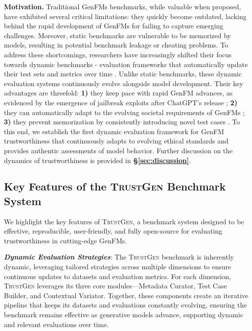 \textbf{Motivation.} Traditional GenFMs benchmarks, while valuable when proposed, have exhibited several critical limitations: they quickly become outdated, lacking behind the rapid development of GenFMs for failing to capture emerging challenges. Moreover, static benchmarks are vulnerable to be memorized by models, resulting in potential benchmark leakage or cheating problems. To address these shortcomings, researchers have increasingly shifted their focus towards dynamic benchmarks - evaluation frameworks that automatically update their test sets and metrics over time \citep{zhang2024task,li2024autobencher,Ni2024MixEvalDW,Li2023LatestEvalAD,Shirali2022ATO,Gao2022AdaptiveTO,Ribeiro2022AdaptiveTA,Leclerc20213DBAF,Yang2023RethinkingBA}. Unlike static benchmarks, these dynamic evaluation systems continuously evolve alongside model development. Their key advantages are threefold: \textbf{1)} they keep pace with rapid GenFM advances, as evidenced by the emergence of jailbreak exploits \cite{wei2024jailbroken} after ChatGPT's release \cite{ChatGPT}; \textbf{2)} they can automatically adapt to the evolving societal requirements of GenFMs \cite{soni2024large}; \textbf{3)} they prevent memorization by consistently introducing novel test cases \citep{white2024livebench}. To this end, we establish the first dynamic evaluation framework for GenFM trustworthiness that continuously adapts to evolving ethical standards and provides authentic assessments of model behavior. Further discussion on the dynamics of trustworthiness is provided in \textbf{\S\ref{sec:discussion}}.

\subsection{Key Features of the \textsc{TrustGen} Benchmark System}

We highlight the key features of \textsc{TrustGen}, a benchmark system designed to be effective, reproducible, user-friendly, and fully open-source for evaluating trustworthiness in cutting-edge GenFMs.

\textbf{\textit{Dynamic Evaluation Strategies}}:
The \textsc{TrustGen} benchmark is inherently dynamic, leveraging tailored strategies across multiple dimensions to ensure continuous updates to datasets and evaluation metrics. For each dimension, \textsc{TrustGen} leverages its three core modules—Metadata Curator, Test Case Builder, and Contextual Variator. Together, these components create an iterative pipeline that keeps its datasets and evaluations constantly evolving, ensuring the benchmark remains effective as generative models advance, supporting dynamic and relevant evaluations over time.

